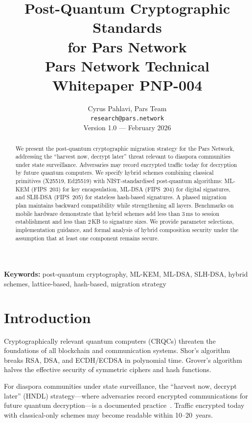 \documentclass[11pt,a4paper]{article}
\title{%
    \textbf{Post-Quantum Cryptographic Standards\\
    for Pars Network}\\[0.5em]
    \large Pars Network Technical Whitepaper PNP-004
}
\author{%
    Cyrus Pahlavi, Pars Team\\
    \texttt{research@pars.network}\\[0.5em]
    \small Version 1.0 --- February 2026
}
\date{}
\begin{document}
\parscoverpage

\thispagestyle{fancy}

\begin{abstract}
\noindent
We present the post-quantum cryptographic migration strategy for the Pars
Network, addressing the ``harvest now, decrypt later'' threat relevant to
diaspora communities under state surveillance.  Adversaries may record
encrypted traffic today for decryption by future quantum computers.  We
specify hybrid schemes combining classical primitives (X25519, Ed25519)
with NIST-standardised post-quantum algorithms: ML-KEM (FIPS~203) for key
encapsulation, ML-DSA (FIPS~204) for digital signatures, and SLH-DSA
(FIPS~205) for stateless hash-based signatures.  A phased migration plan
maintains backward compatibility while strengthening all layers.  Benchmarks
on mobile hardware demonstrate that hybrid schemes add less than 3\,ms to
session establishment and less than 2\,KB to signature sizes.  We provide
parameter selections, implementation guidance, and formal analysis of hybrid
composition security under the assumption that at least one component
remains secure.
\end{abstract}

\vspace{1em}
\noindent\textbf{Keywords:} post-quantum cryptography, ML-KEM, ML-DSA,
SLH-DSA, hybrid schemes, lattice-based, hash-based, migration strategy

\tableofcontents
\newpage

\section{Introduction}
\label{sec:introduction}

Cryptographically relevant quantum computers (CRQCs) threaten the
foundations of all blockchain and communication systems.  Shor's
algorithm~\cite{shor1994algorithms} breaks RSA, DSA, and ECDH/ECDSA in
polynomial time.  Grover's algorithm~\cite{grover1996fast} halves the
effective security of symmetric ciphers and hash functions.

For diaspora communities under state surveillance, the ``harvest now,
decrypt later'' (HNDL) strategy---where adversaries record encrypted
communications for future quantum decryption---is a documented
practice~\cite{nsareport2016quantum}.  Traffic encrypted today with
classical-only schemes may become readable within 10--20~years.
\end{document}
